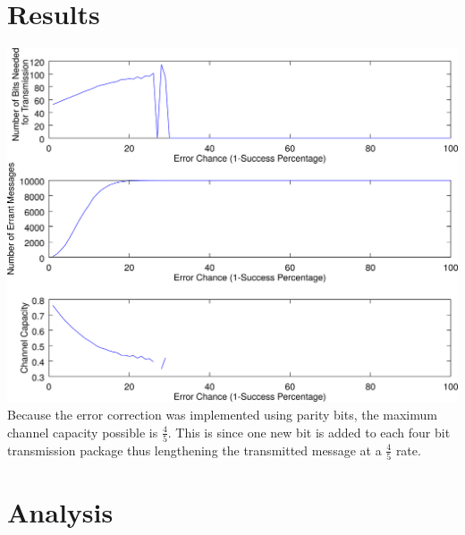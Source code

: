 \documentclass{article}
\begin{document}
   \section{Results}
      \includegraphics[width=\textwidth]{images/polyline288.png}
      Because the error correction was implemented using parity bits,
      the maximum channel capacity possible is $\frac{4}{5}$. This is since
      one new bit is added to each four bit transmission package thus lengthening
      the transmitted message at a $\frac{4}{5}$ rate.
   \section{Analysis}
\end{document}
